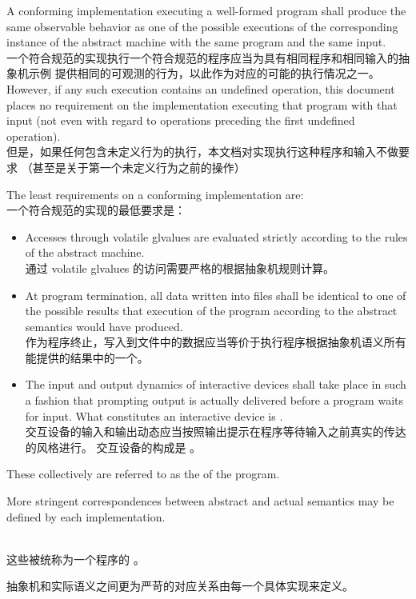 %
%
\pnum
A conforming implementation executing a well-formed program shall
produce the same observable behavior as one of the possible executions
of the corresponding instance of the abstract machine with the
same program and the same input. \\
一个符合规范的实现执行一个符合规范的程序应当为具有相同程序和相同输入的抽象机示例
提供相同的可观测的行为，以此作为对应的可能的执行情况之一。
%
However, if any such execution contains an undefined operation, this document places no
requirement on the implementation executing that program with that input
(not even with regard to operations preceding the first undefined
operation). \\
但是，如果任何包含未定义行为的执行，本文档对实现执行这种程序和输入不做要求
（甚至是关于第一个未定义行为之前的操作）

\pnum
The least requirements on a conforming implementation are: \\
一个符合规范的实现的最低要求是：
\begin{itemize}
\item
Accesses through volatile glvalues are evaluated strictly according to the
rules of the abstract machine. \\
通过 volatile glvalues 的访问需要严格的根据抽象机规则计算。
\item
At program termination, all data written into files shall be
identical to one of the possible results that execution of the program
according to the abstract semantics would have produced. \\
作为程序终止，写入到文件中的数据应当等价于执行程序根据抽象机语义所有能提供的结果中的一个。
\item
The input and output dynamics of interactive devices shall take
place in such a fashion that prompting output is actually delivered before a program waits for input. What constitutes an interactive device is
. \\
交互设备的输入和输出动态应当按照输出提示在程序等待输入之前真实的传达的风格进行。
交互设备的构成是 
。
\end{itemize}

These collectively are referred to as the
 of the program.
\begin{note} More stringent correspondences between abstract and actual
semantics may be defined by each implementation. \end{note} \\
这些被统称为一个程序的 。
\begin{note}抽象机和实际语义之间更为严苛的对应关系由每一个具体实现来定义。\end{note}

